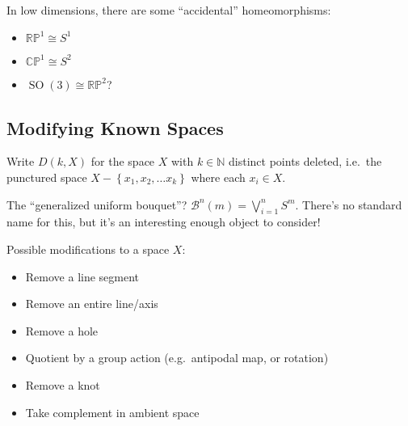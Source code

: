 \begin{remark}

In low dimensions, there are some ``accidental'' homeomorphisms:

\begin{itemize}
\tightlist
\item
  \({\mathbb{RP}}^1 \cong S^1\)
\item
  \({\mathbb{CP}}^1 \cong S^2\)
\item
  \({\operatorname{SO}}(3) \cong {\mathbb{RP}}^2\)?
\end{itemize}

\end{remark}

\hypertarget{modifying-known-spaces}{%
\subsection{Modifying Known Spaces}\label{modifying-known-spaces}}

\begin{example}

Write \(D(k, X)\) for the space \(X\) with \(k\in {\mathbb{N}}\)
distinct points deleted, i.e.~the punctured space
\(X - \left\{{x_{1}, x_{2}, \ldots x_{k}}\right\}\) where each
\(x_{i} \in X\).

\end{example}

\begin{example}

The ``generalized uniform bouquet''?
\(\mathcal{B}^n(m) = \bigvee_{i=1}^n S^m\). There's no standard name for
this, but it's an interesting enough object to consider!

\end{example}

\begin{example}

Possible modifications to a space \(X\):

\begin{itemize}
\tightlist
\item
  Remove a line segment
\item
  Remove an entire line/axis
\item
  Remove a hole
\item
  Quotient by a group action (e.g.~antipodal map, or rotation)
\item
  Remove a knot
\item
  Take complement in ambient space
\end{itemize}

\end{example}

